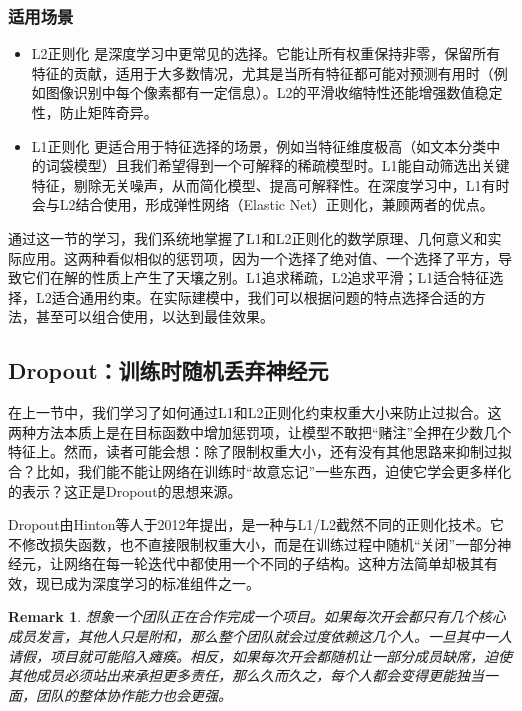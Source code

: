 \documentclass[lang=cn,zihao=-4,a4paper,fontset=windows]{beautybook}
\newtheorem*{remark}{\textbf{Remark}}
\begin{document}
\subsubsection*{适用场景}

\begin{itemize}
\item L2正则化 是深度学习中更常见的选择。它能让所有权重保持非零，保留所有特征的贡献，适用于大多数情况，尤其是当所有特征都可能对预测有用时（例如图像识别中每个像素都有一定信息）。L2的平滑收缩特性还能增强数值稳定性，防止矩阵奇异。
\item L1正则化 更适合用于特征选择的场景，例如当特征维度极高（如文本分类中的词袋模型）且我们希望得到一个可解释的稀疏模型时。L1能自动筛选出关键特征，剔除无关噪声，从而简化模型、提高可解释性。在深度学习中，L1有时会与L2结合使用，形成弹性网络（Elastic Net）正则化，兼顾两者的优点。
\end{itemize}

通过这一节的学习，我们系统地掌握了L1和L2正则化的数学原理、几何意义和实际应用。这两种看似相似的惩罚项，因为一个选择了绝对值、一个选择了平方，导致它们在解的性质上产生了天壤之别。L1追求稀疏，L2追求平滑；L1适合特征选择，L2适合通用约束。在实际建模中，我们可以根据问题的特点选择合适的方法，甚至可以组合使用，以达到最佳效果。

\subsection{Dropout：训练时随机丢弃神经元}

在上一节中，我们学习了如何通过L1和L2正则化约束权重大小来防止过拟合。这两种方法本质上是在目标函数中增加惩罚项，让模型不敢把“赌注”全押在少数几个特征上。然而，读者可能会想：除了限制权重大小，还有没有其他思路来抑制过拟合？比如，我们能不能让网络在训练时“故意忘记”一些东西，迫使它学会更多样化的表示？这正是Dropout的思想来源。

Dropout由Hinton等人于2012年提出，是一种与L1/L2截然不同的正则化技术。它不修改损失函数，也不直接限制权重大小，而是在训练过程中随机“关闭”一部分神经元，让网络在每一轮迭代中都使用一个不同的子结构。这种方法简单却极其有效，现已成为深度学习的标准组件之一。

\begin{remark}
想象一个团队正在合作完成一个项目。如果每次开会都只有几个核心成员发言，其他人只是附和，那么整个团队就会过度依赖这几个人。一旦其中一人请假，项目就可能陷入瘫痪。相反，如果每次开会都随机让一部分成员缺席，迫使其他成员必须站出来承担更多责任，那么久而久之，每个人都会变得更能独当一面，团队的整体协作能力也会更强。
\end{remark}
\end{document}
